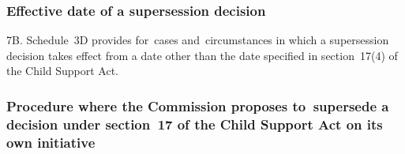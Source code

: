 \documentclass[12pt,a4paper]{article}
\begin{document}
{%
%
%
%
%
%
%
%

\subsubsection[7B. Effective date of a supersession decision]{Effective date of a supersession decision}

7B.  Schedule~3D provides for~cases and~circumstances in which a supersession decision takes effect from a date other than the date specified in section~17(4) of the Child Support   Act.


\subsubsection[7C. Procedure where the 
Commission  %
proposes to~supersede a decision under section~17 of the Child Support Act on 
its  %
own initiative]{Procedure where the 
Commission  %
proposes to~supersede a decision under section~17 of the Child Support Act on 
its  %
own initiative}

}
\end{document}
